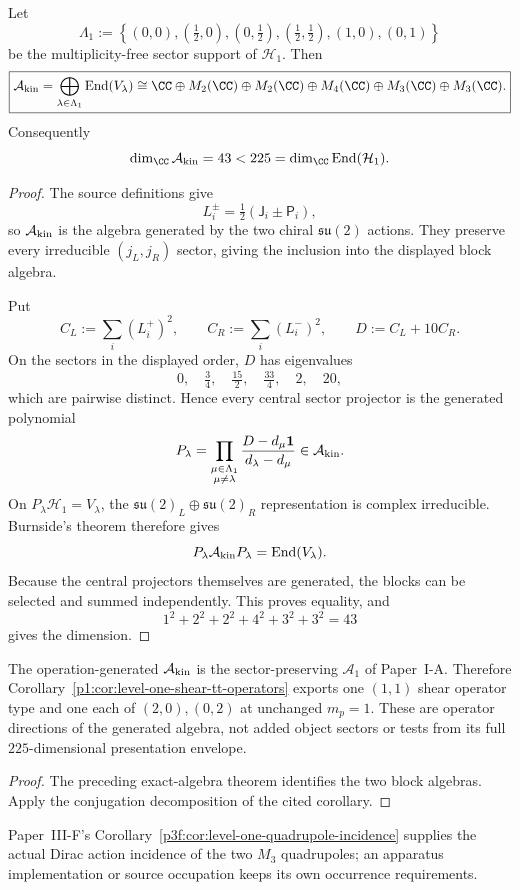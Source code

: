 \documentclass[12pt,a4paper]{article}
\begin{document}
\begin{theorem}
\label{p2c:thm:exact-level-one-kinematic-algebra}
Let
\[
 \Lambda_1
 :=\left\{(0,0),(\tfrac12,0),(0,\tfrac12),(\tfrac12,\tfrac12),
             (1,0),(0,1)\right\}
\]
be the multiplicity-free sector support of \(\mathcal H_1\).  Then
\[
 \boxed{
 \mathcal A_{\rm kin}
 =\bigoplus_{\lambda\in\Lambda_1}\operatorname{End}(V_\lambda)
 \cong
 \CC\oplus M_2(\CC)\oplus M_2(\CC)\oplus M_4(\CC)
     \oplus M_3(\CC)\oplus M_3(\CC).}
\]
Consequently
\[
 \dim_{\CC}\mathcal A_{\rm kin}=43
 <225=\dim_{\CC}\operatorname{End}(\mathcal H_1).
\]
\end{theorem}

\begin{proof}
The source definitions give
\[
 L_i^\pm=\tfrac12(\mathsf J_i\pm\mathsf P_i),
\]
so \(\mathcal A_{\rm kin}\) is the algebra generated by the two chiral
\(\mathfrak{su}(2)\) actions.  They preserve every irreducible
\((j_L,j_R)\) sector, giving the inclusion into the displayed block algebra.

Put
\[
 C_L:=\sum_i(L_i^+)^2,
 \qquad
 C_R:=\sum_i(L_i^-)^2,
 \qquad
 D:=C_L+10C_R.
\]
On the sectors in the displayed order, \(D\) has eigenvalues
\[
 0,\quad \tfrac34,\quad \tfrac{15}{2},\quad
 \tfrac{33}{4},\quad 2,\quad20,
\]
which are pairwise distinct.  Hence every central sector projector is the
generated polynomial
\[
 P_\lambda
 =\prod_{\substack{\mu\in\Lambda_1\\\mu\ne\lambda}}
   \frac{D-d_\mu\mathbf1}{d_\lambda-d_\mu}
 \in\mathcal A_{\rm kin}.
\]
On \(P_\lambda\mathcal H_1=V_\lambda\), the
\(\mathfrak{su}(2)_L\oplus\mathfrak{su}(2)_R\) representation is complex
irreducible.  Burnside's theorem therefore gives
\[
 P_\lambda\mathcal A_{\rm kin}P_\lambda
 =\operatorname{End}(V_\lambda).
\]
Because the central projectors themselves are generated, the blocks can be
selected and summed independently.  This proves equality, and
\[
 1^2+2^2+2^2+4^2+3^2+3^2=43
\]
gives the dimension.
\end{proof}

\begin{corollary}
\label{p2c:cor:generated-level-one-tt-operators}
The operation-generated $\mathcal A_{\rm kin}$ is the sector-preserving
$\mathcal A_1$ of Paper~I-A. Therefore
Corollary~\ref{p1:cor:level-one-shear-tt-operators} exports one $(1,1)$
shear operator type and one each of $(2,0),(0,2)$ at unchanged $m_p=1$.
These are operator directions of the generated algebra, not added object
sectors or tests from its full $225$-dimensional presentation envelope.
\end{corollary}
\begin{proof}
The preceding exact-algebra theorem identifies the two block algebras.
Apply the conjugation decomposition of the cited corollary.
\end{proof}
Paper~III-F's Corollary~\ref{p3f:cor:level-one-quadrupole-incidence}
supplies the actual Dirac action incidence of the two $M_3$ quadrupoles;
an apparatus implementation or source occupation keeps its own occurrence
requirements.
\end{document}
